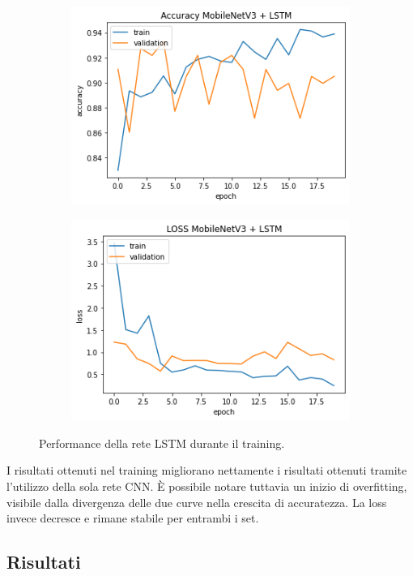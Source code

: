 \documentclass[11pt]{report}
\begin{document}
\begin{figure}[h]
\centering
	\begin{subfigure}[t]{.45\textwidth}
	\centering
    \includegraphics[scale = 0.5]{img/LSTM-accuracy.png}
	\end{subfigure}
	\quad
	\begin{subfigure}[t]{.45\textwidth}
	\centering
    \includegraphics[scale = 0.5]{img/LSTM-Loss.png}
	\end{subfigure}
	\quad
\caption{Performance della rete LSTM durante il training.}
\label{fig:train-LSTM}
\end{figure}


I risultati ottenuti nel training migliorano nettamente i risultati ottenuti tramite l'utilizzo della sola rete CNN. È possibile notare tuttavia un inizio di overfitting, visibile dalla divergenza delle due curve nella crescita di accuratezza. La loss invece decresce e rimane stabile per entrambi i set.

\newpage

\subsection{Risultati}
\end{document}

